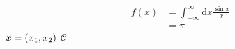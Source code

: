 \documentclass[43pt]{jsarticle}
\def\vector#1{\mbox{\boldmath \(#1\)}}
\begin{document}
\begin{align*}
    f(x) &= \int^{\infty}_{-\infty}\mathrm{d}x \frac{\sin x}{x} \\
         &= \pi
\end{align*}
\newpage
$\vector{x} = (x_{1}, x_{2})$
\newpage
$\mathcal{C}$
\end{document}
